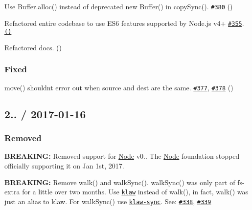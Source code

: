 \begin{DoxyItemize}
\item Use {\ttfamily Buffer.\+alloc()} instead of deprecated {\ttfamily new Buffer()} in {\ttfamily copy\+Sync()}. \href{https://github.com/jprichardson/node-fs-extra/pull/380}{\tt \#380} (\href{https://github.com/manidlou}{\tt })
\item Refactored entire codebase to use E\+S6 features supported by Node.\+js v4+ \href{https://github.com/jprichardson/node-fs-extra/issues/355}{\tt \#355}. \href{https://github.com/JPeer264}{\tt ()}
\item Refactored docs. (\href{https://github.com/manidlou}{\tt })
\end{DoxyItemize}

\subsubsection*{Fixed}


\begin{DoxyItemize}
\item {\ttfamily move()} shouldn\textquotesingle{}t error out when source and dest are the same. \href{https://github.com/jprichardson/node-fs-extra/issues/377}{\tt \#377}, \href{https://github.com/jprichardson/node-fs-extra/pull/378}{\tt \#378} (\href{https://github.com/jdalton}{\tt })
\end{DoxyItemize}

\subsection*{2.. / 2017-\/01-\/16 }

\subsubsection*{Removed}


\begin{DoxyItemize}
\item {\bfseries B\+R\+E\+A\+K\+I\+NG\+:} Removed support for \mbox{\hyperlink{classNode}{Node}} {\ttfamily v0.}. The \mbox{\hyperlink{classNode}{Node}} foundation stopped officially supporting it on Jan 1st, 2017.
\item {\bfseries B\+R\+E\+A\+K\+I\+NG\+:} Remove {\ttfamily walk()} and {\ttfamily walk\+Sync()}. {\ttfamily walk\+Sync()} was only part of {\ttfamily fs-\/extra} for a little over two months. Use \href{https://github.com/jprichardson/node-klaw}{\tt klaw} instead of {\ttfamily walk()}, in fact, {\ttfamily walk()} was just an alias to klaw. For {\ttfamily walk\+Sync()} use \href{https://github.com/mawni/node-klaw-sync}{\tt klaw-\/sync}. See\+: \href{https://github.com/jprichardson/node-fs-extra/issues/338}{\tt \#338}, \href{https://github.com/jprichardson/node-fs-extra/pull/339}{\tt \#339}
\end{DoxyItemize}

